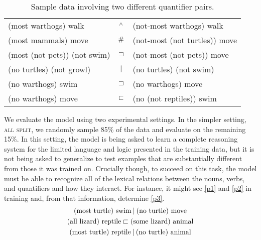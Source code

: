 

\begin{table}[htp]
  \centering
  \begin{tabular}{l c l}
    \toprule
    (most warthogs) walk         & $\mathbin{^{\wedge}}$ & (not-most warthogs) walk\\
    (most mammals) move          & $\mathbin{\#}$ &  (not-most (not turtles)) move\\
    (most (not pets)) (not swim) & $\sqsupset$ & (not-most (not pets)) move 
    \\[2ex]    
    (no turtles) (not growl)     & $\mathbin{|}$ & (no turtles) (not swim)\\
    (no warthogs) swim           & $\sqsupset$ & (no warthogs) move\\
    (no warthogs) move           & $\sqsubset$ & (no (not reptiles)) swim\\
    \bottomrule
  \end{tabular}
  \caption{Sample data involving two different quantifier pairs.}
  \label{examplesofdata}
\end{table}

We evaluate the model using two experimental settings. In the simpler
setting, \textsc{all split}, we randomly sample 85\% of the data and evaluate on the
remaining 15\%. In this setting, the model is being asked to learn a
complete reasoning system for the limited language and logic presented
in the training data, but it is not being asked to generalize to test
examples that are substantially different from those it was trained
on. Crucially though, to succeed on this task, the model must be able
to recognize all of the lexical relations between the nouns, verbs,
and quantifiers and how they interact. For instance, it might see
\eqref{p1} and \eqref{p2} in training and, from that information,
determine \eqref{p3}.
%
\begin{gather}
  \text{(most turtle) swim} \mathbin{|} \text{(no turtle) move}\label{p1}
  \\
  \text{(all lizard) reptile} \sqsubset  \text{(some lizard) animal}\label{p2}
  \\
  \text{(most turtle) reptile} \mathbin{|} \text{(no turtle) animal}\label{p3}
\end{gather}

